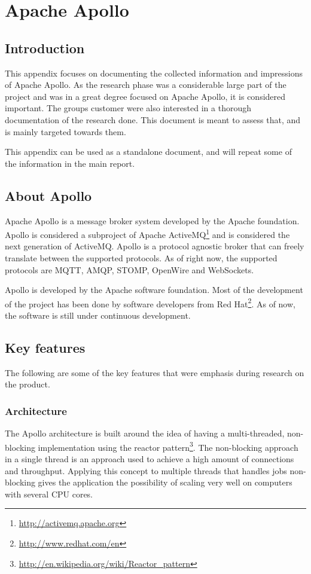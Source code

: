 \chapter{Apache Apollo}
\label{appendix:apache-apollo}


\section{Introduction}

This appendix focuses on documenting the collected information and impressions of Apache Apollo. As the research phase was a considerable large part of the project and was in a great degree focused on Apache Apollo, it is considered important. The groups customer were also interested in a thorough documentation of the research done. This document is meant to assess that, and is mainly targeted towards them.

This appendix can be used as a standalone document, and will repeat some of the information in the main report.

\section{About Apollo}
Apache Apollo is a message broker system developed by the Apache foundation. Apollo is considered a subproject of Apache ActiveMQ\footnote{\url{http://activemq.apache.org}} and is considered the next generation of ActiveMQ. Apollo is a protocol agnostic broker that can freely translate between the supported protocols. As of right now, the supported protocols are MQTT, AMQP, STOMP, OpenWire and WebSockets. 

Apollo is developed by the Apache software foundation. Most of the development of the project has been done by software developers from Red Hat\footnote{\url{http://www.redhat.com/en}}. As of now, the software is still under continuous development.

\section{Key features}

The following are some of the key features that were emphasis during research on the product. 

\subsection{Architecture}
The Apollo architecture is built around the idea of having a multi-threaded, non-blocking implementation using the reactor pattern\footnote{\url{http://en.wikipedia.org/wiki/Reactor_pattern}}. The non-blocking approach in a single thread is an approach used to achieve a high amount of connections and throughput. Applying this concept to multiple threads that handles jobs non-blocking gives the application the possibility of scaling very well on computers with several CPU cores.

